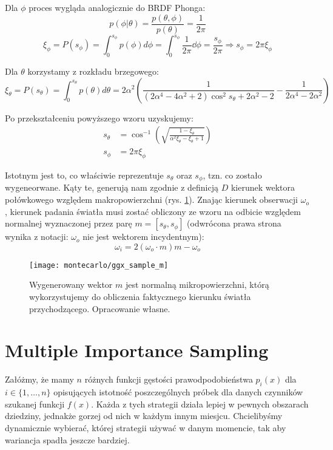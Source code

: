 \documentclass[../main.tex]{subfiles}
\begin{document}
Dla $\phi$ proces wygląda analogicznie do BRDF Phonga:
\[
  p(\phi | \theta) = \frac{
    p(\theta, \phi)
	}{
		p(\theta)
	} = \frac{1}{2\pi}
\]
\[
	\xi_\phi = P(s_{\phi}) =
	\int_{0}^{s_{\phi}} {
		p(\phi) d\phi
	} =
	\int_{0}^{s_{\phi}} {
		\frac{1}{2\pi}
        \dd \phi
	} =
	\frac{s_{\phi}}{2\pi}
  \Rightarrow
	s_{\phi} = 2 \pi \xi_{\phi}
\]

Dla $\theta$ korzystamy z rozkładu brzegowego:
\[
  \xi_\theta = P(s_{\theta}) =
	\int_{0}^{s_{\theta}} {
		p(\theta) d\theta
	} =
  2 \alpha^2 \left(
    \frac{1}{
      (2\alpha^4 - 4\alpha^2 + 2) \cos^{2}{s_\theta} + 2\alpha^2 - 2
    } - \frac{1}{
      2\alpha^4 - 2\alpha^2
    }
  \right)
\]

Po przekształceniu powyższego wzoru uzyskujemy:
\begin{align*}
  s_\theta &= \cos^{-1}\left(
    \sqrt{
      \frac{1 - \xi_\theta}{\alpha^2 \xi_\theta - \xi_\theta + 1}
    }
  \right) \\
  s_{\phi} &= 2 \pi \xi_{\phi}
\end{align*}

Istotnym jest to, co właściwie reprezentuje $s_\theta$ oraz $s_\phi$, tzn. co zostało wygeneorwane. Kąty te, generują nam zgodnie z definicją $D$ kierunek wektora połówkowego względem makropowierzchni (rys. \ref{fig:GGXSampleMReflect}). Znając kierunek obserwacji $\omega_o$, kierunek padania światła musi zostać obliczony ze wzoru na odbicie względem normalnej wyznaczonej przez parę $m = [s_\theta, s_\phi]$ (odwrócona prawa strona wynika z notacji: $\omega_o$ nie jest wektorem incydentnym):
\[
	\omega_i = 2(\omega_o \cdot m)m - \omega_o
\]

\begin{figure}[h]
    \centering
    \texttt{[image: montecarlo/ggx\_sample\_m]}
    \caption{Wygenerowany wektor $m$ jest normalną mikropowierzchni, którą wykorzystujemy do obliczenia faktycznego kierunku światła przychodzącego. Opracowanie własne.}
    \label{fig:GGXSampleMReflect}
\end{figure}

\section{Multiple Importance Sampling}
\label{Chapter:MIS}

Załóżmy, że mamy $n$ różnych funkcji gęstości prawodpodobieństwa $p_{i}(x)$ dla
$i \in \{ 1, \ldots, n \}$ opisujących istotność poszczególnych próbek dla
danych czynników szukanej funkcji $f(x)$. Każda z tych strategii działa lepiej
w pewnych obszarach dziedziny, jednakże gorzej od nich w każdym innym miesjcu.
Chcielibyśmy dynamicznie wybierać, której strategii używać w danym momencie,
tak aby wariancja spadła jeszcze bardziej.
\end{document}
